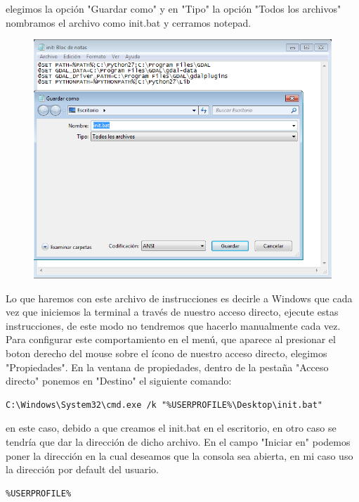 \documentclass[11pt, spanish]{memoir}
\begin{document}
elegimos la opción "Guardar como" y en "Tipo" la opción "Todos los archivos" nombramos el archivo como init.bat y cerramos notepad. 

\begin{figure}[H]
\centering
\includegraphics[width=14cm]{acceso_directo3.png}
\end{figure}

Lo que haremos con este archivo de instrucciones es decirle a Windows que cada vez que iniciemos la terminal a través de nuestro acceso directo, ejecute estas instrucciones, de este modo no tendremos que hacerlo manualmente cada vez. Para configurar este comportamiento en el menú, que aparece al presionar el boton derecho del mouse sobre el ícono de nuestro acceso directo, elegimos "Propiedades". En la ventana de propiedades, dentro de la pestaña "Acceso directo" ponemos en "Destino" el siguiente comando:

\begin{lstlisting} 
C:\Windows\System32\cmd.exe /k "%USERPROFILE%\Desktop\init.bat"
\end{lstlisting}

en este caso, debido a que creamos el init.bat en el escritorio, en otro caso se tendría que dar la dirección de dicho archivo. En el campo "Iniciar en" podemos poner la dirección en la cual deseamos que la consola sea abierta, en mi caso uso la dirección por default del usuario.

\begin{lstlisting} 
%USERPROFILE%
\end{lstlisting}
\end{document}
